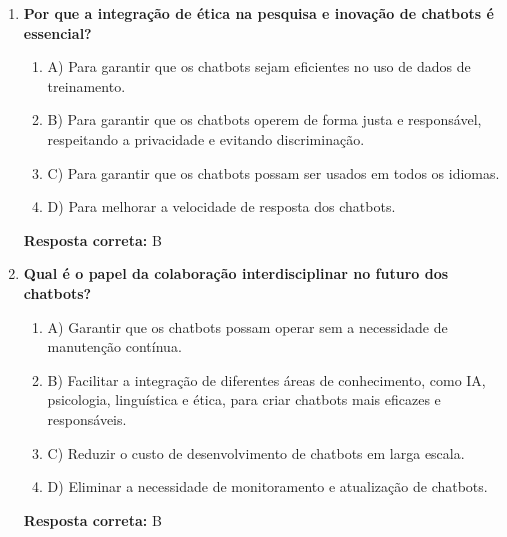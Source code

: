 \documentclass[14pt,a4paper,oneside]{book}
\begin{document}
\begin{enumerate}
	\item \textbf{Por que a integração de ética na pesquisa e inovação de chatbots é essencial?}
	\begin{enumerate}[label=\alph*)]
		\item A) Para garantir que os chatbots sejam eficientes no uso de dados de treinamento.
		\item B) Para garantir que os chatbots operem de forma justa e responsável, respeitando a privacidade e evitando discriminação.
		\item C) Para garantir que os chatbots possam ser usados em todos os idiomas.
		\item D) Para melhorar a velocidade de resposta dos chatbots.
	\end{enumerate}
	\vspace{5mm}
	\textbf{Resposta correta:} B
	
	\item \textbf{Qual é o papel da colaboração interdisciplinar no futuro dos chatbots?}
	\begin{enumerate}[label=\alph*)]
		\item A) Garantir que os chatbots possam operar sem a necessidade de manutenção contínua.
		\item B) Facilitar a integração de diferentes áreas de conhecimento, como IA, psicologia, linguística e ética, para criar chatbots mais eficazes e responsáveis.
		\item C) Reduzir o custo de desenvolvimento de chatbots em larga escala.
		\item D) Eliminar a necessidade de monitoramento e atualização de chatbots.
	\end{enumerate}
	\vspace{5mm}
	\textbf{Resposta correta:} B
	
\end{enumerate}




\end{document}
